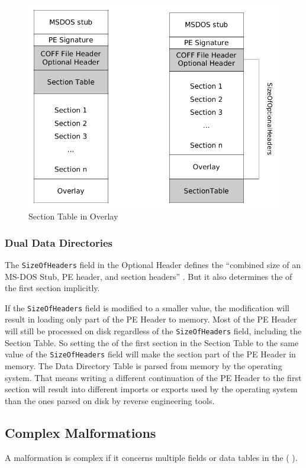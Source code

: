 \begin{figure}
\includegraphics[width=.98\textwidth, height=.60\textheight,keepaspectratio]{graphics/overlaysectable}
\caption{Section Table in Overlay }
\label{fig:overlaysectable} 
\end{figure}

\subsubsection*{Dual Data Directories}

The \texttt{SizeOfHeaders} field in the Optional Header defines the \enquote{combined size of an MS-DOS Stub, PE header, and section headers} \cite[]{pespec}. But it also determines the \VA{} of the first section implicitly. \cite[slide 15]{vuksan11} 

If the \texttt{SizeOfHeaders} field is modified to a smaller value, the modification will result in loading only part of the PE Header to memory. Most of the PE Header will still be processed on disk regardless of the \texttt{SizeOfHeaders} field, including the Section Table. So setting the \VA{} of the first section in the Section Table to the same value of the \texttt{SizeOfHeaders} field will make the section part of the PE Header in memory. 
The Data Directory Table is parsed from memory by the operating system. That means writing a different continuation of the PE Header to the first section will result into \eg{} different imports or exports used by the operating system than the ones parsed on disk by reverse engineering tools.


\subsection{Complex Malformations}

A malformation is complex if it concerns multiple fields or data tables in the \PE{} (\cf{} \cite[slide 7]{vuksan11}).
